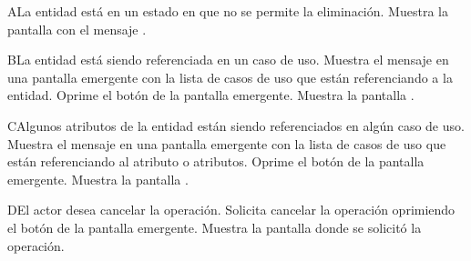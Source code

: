  \begin{UCtrayectoriaA}{A}{La entidad está en un estado en que no se permite la eliminación.}
    \UCpaso[\UCsist] Muestra la pantalla  con el mensaje .
 \end{UCtrayectoriaA} 
 \begin{UCtrayectoriaA}{B}{La entidad está siendo referenciada en un caso de uso.}
    \UCpaso[\UCsist] Muestra el mensaje  en una pantalla emergente
    con la lista de casos de uso que están referenciando a la entidad.
    \UCpaso[\UCactor] Oprime el botón  de la pantalla emergente.
    \UCpaso[\UCsist] Muestra la pantalla .
 \end{UCtrayectoriaA}
 \begin{UCtrayectoriaA}{C}{Algunos atributos de la entidad están siendo referenciados en algún caso de uso.}
    \UCpaso[\UCsist] Muestra el mensaje  en una pantalla emergente
    con la lista de casos de uso que están referenciando al atributo o atributos.
    \UCpaso[\UCactor] Oprime el botón  de la pantalla emergente.
    \UCpaso[\UCsist] Muestra la pantalla .
 \end{UCtrayectoriaA}
 \begin{UCtrayectoriaA}{D}{El actor desea cancelar la operación.}
    \UCpaso[\UCactor] Solicita cancelar la operación oprimiendo el botón  de la pantalla emergente.
    \UCpaso[\UCsist] Muestra la pantalla donde se solicitó la operación.
 \end{UCtrayectoriaA} 